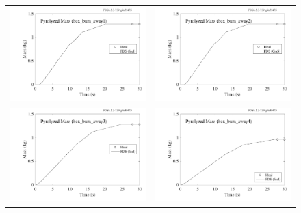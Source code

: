 \documentclass[11pt]{book}
\begin{document}
\begin{figure}[ht]
\begin{tabular*}{\textwidth}{lr}
\includegraphics[width=3.2in]{SCRIPT_FIGURES/box_burn_away1} &
\includegraphics[width=3.2in]{SCRIPT_FIGURES/box_burn_away2} \\
\includegraphics[width=3.2in]{SCRIPT_FIGURES/box_burn_away3} &
\includegraphics[width=3.2in]{SCRIPT_FIGURES/box_burn_away4} \\

\end{tabular*}
\end{figure}
\end{document}
